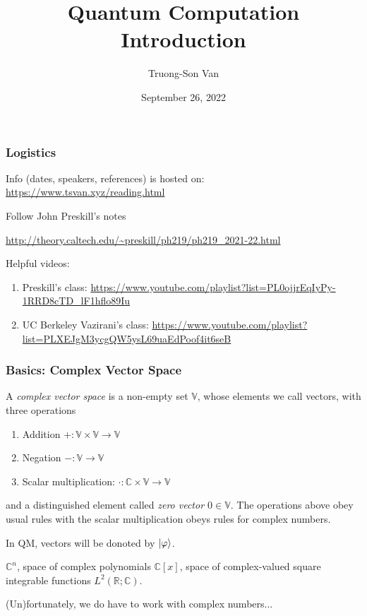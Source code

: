 \documentclass[12pt]{beamer}
\title{ Quantum Computation \\ Introduction }
\author{Truong-Son Van}
\institute{Fulbright University Vietnam Reading Group}
\date{September 26, 2022}
\begin{document}
\frame{\titlepage}

\begin{frame}
    \frametitle{Logistics}
    Info (dates, speakers, references) is hosted on: \url{https://www.tsvan.xyz/reading.html}
    
    Follow John Preskill's notes 

    \url{http://theory.caltech.edu/~preskill/ph219/ph219_2021-22.html}

    Helpful videos:
    \begin{enumerate}
        \item Preskill's class: \url{https://www.youtube.com/playlist?list=PL0ojjrEqIyPy-1RRD8cTD_lF1hflo89Iu}
        \item UC Berkeley Vazirani's class: \url{https://www.youtube.com/playlist?list=PLXEJgM3ycgQW5ysL69uaEdPoof4it6seB}
    \end{enumerate}
\end{frame}

\begin{frame}
    \frametitle{ Basics: Complex Vector Space}
    A \emph{complex vector space} is a non-empty set $\mathbb{V}$, whose elements we call vectors, with three 
    operations
    \begin{enumerate}
        \item Addition $+: \mathbb{V} \times \mathbb{V} \to \mathbb{V}$
        \item Negation $-: \mathbb{V}\to \mathbb{V}$
        \item Scalar multiplication: $\cdot : \mathbb{C} \times \mathbb{V} \to \mathbb{V}$
    \end{enumerate}
    and a distinguished element called \emph{zero vector $0\in \mathbb{V}$}.
    The operations above obey usual rules with the scalar multiplication obeys rules for complex numbers.

    In QM, vectors will be donoted by $\ket{\varphi}$.

    \begin{example}
        $\mathbb{C}^n$, space of complex polynomials $\mathbb{C}[x]$, 
        space of complex-valued square integrable functions $L^2(\mathbb{R};\mathbb{C})$.
    \end{example}

    (Un)fortunately, we do have to work with complex numbers...
\end{frame}
\end{document}
